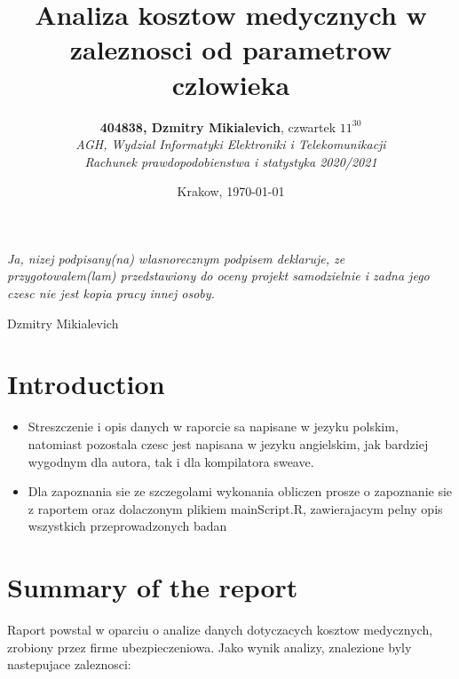 \documentclass{article}
\title{Analiza kosztow medycznych w zaleznosci od parametrow czlowieka}
\author{\textbf{404838, Dzmitry Mikialevich}, czwartek $11^{30}$\\ 
\textit{AGH, Wydzial Informatyki Elektroniki i Telekomunikacji}\\
\textit{Rachunek prawdopodobienstwa i statystyka 2020/2021}}
\date{Krakow, \today}
\begin{document}

\maketitle
\newenvironment{centerfig}
{\begin{figure}[H]\centering}
{\end{figure}}


\textit{Ja, nizej podpisany(na) wlasnorecznym podpisem deklaruje, ze przygotowalem(lam) przedstawiony do oceny projekt samodzielnie i zadna jego czesc nie jest kopia pracy innej osoby.}
\begin{flushright}
{Dzmitry Mikialevich}
\end{flushright}

\tableofcontents

\newpage

\section{Introduction}
\begin{itemize}
\item Streszczenie i opis danych w raporcie sa napisane w jezyku polskim, natomiast pozostala czesc jest napisana w jezyku angielskim, jak bardziej wygodnym dla autora, tak i dla kompilatora sweave.
\item Dla zapoznania sie ze szczegolami wykonania obliczen prosze o zapoznanie sie z raportem oraz dolaczonym plikiem mainScript.R, zawierajacym pelny opis wszystkich przeprowadzonych badan
\end{itemize}

\section{Summary of the report}
Raport powstal w oparciu o analize danych dotyczacych kosztow medycznych, zrobiony przez firme ubezpieczeniowa. \newline
Jako wynik analizy, znalezione byly nastepujace zaleznosci:
\end{document}
